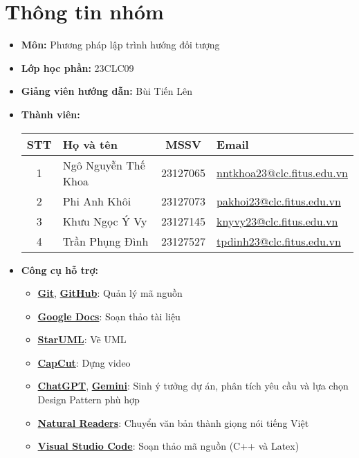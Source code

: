\section{Thông tin nhóm}
\begin{itemize}
  \item \textbf{Môn:} Phương pháp lập trình hướng đối tượng
  \item \textbf{Lớp học phần:} 23CLC09
  \item \textbf{Giảng viên hướng dẫn:} Bùi Tiến Lên
  \item \textbf{Thành viên:}
        \begin{center}
          \renewcommand{\arraystretch}{1.5}
          \begin{tabular}{|c|l|c|l|}
            \hline
            \textbf{STT} & \textbf{Họ và tên}  & \textbf{MSSV} & \textbf{Email}                                                       \\\hline
            1            & Ngô Nguyễn Thế Khoa & 23127065      & \href{mailto:nntkhoa23@clc.fitus.edu.vn}{nntkhoa23@clc.fitus.edu.vn} \\\hline
            2            & Phi Anh Khôi        & 23127073      & \href{mailto:pakhoi23@clc.fitus.edu.vn}{pakhoi23@clc.fitus.edu.vn}   \\\hline
            3            & Khưu Ngọc Ý Vy      & 23127145      & \href{mailto:knyvy23@clc.fitus.edu.vn}{knyvy23@clc.fitus.edu.vn}     \\\hline
            4            & Trần Phụng Đình     & 23127527      & \href{mailto:tpdinh23@clc.fitus.edu.vn}{tpdinh23@clc.fitus.edu.vn}   \\\hline
          \end{tabular}
        \end{center}
  \item \textbf{Công cụ hỗ trợ:}
        \begin{itemize}
          \item \href{https://git-scm.com/}{\textbf{Git}}, \href{https://github.com/}{\textbf{GitHub}}: Quản lý mã nguồn
          \item \href{https://docs.google.com/docs/}{\textbf{Google Docs}}: Soạn thảo tài liệu
          \item \href{https://staruml.io/}{\textbf{StarUML}}: Vẽ UML
          \item \href{https://www.capcut.com/}{\textbf{CapCut}}: Dựng video
          \item \href{https://chatgpt.com/}{\textbf{ChatGPT}}, \href{https://gemini.google.com/}{\textbf{Gemini}}: Sinh ý tưởng dự án, phân tích yêu cầu và lựa chọn Design Pattern phù hợp
          \item \href{https://www.naturalreaders.com}{\textbf{Natural Readers}}: Chuyển văn bản thành giọng nói tiếng Việt
          \item \href{https://code.visualstudio.com/}{\textbf{Visual Studio Code}}: Soạn thảo mã nguồn (C++ và Latex)
        \end{itemize}
\end{itemize}
